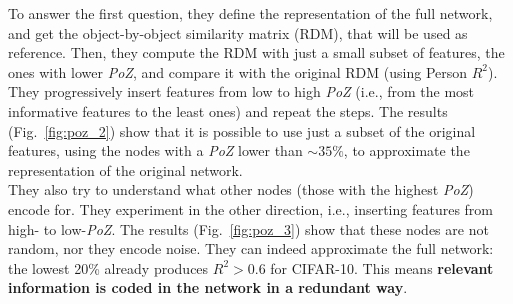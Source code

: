 To answer the first question, they define the representation of the full network, and get the object-by-object similarity matrix (RDM), that will be used as reference. Then, they compute the RDM with just a small subset of features, the ones with lower \textit{PoZ}, and compare it with the original RDM (using Person $R^2$). They progressively insert features from low to high \textit{PoZ} (i.e., from the most informative features to the least ones) and repeat the steps. The results (Fig.~\ref{fig:poz_2}) show that it is possible to use just a subset of the original features, using the nodes with a \textit{PoZ} lower than $\sim35\%$, to approximate the representation of the original network.\\

They also try to understand what other nodes (those with the highest \textit{PoZ}) encode for. They experiment in the other direction, i.e., inserting features from high- to low-\textit{PoZ}. The results (Fig.~\ref{fig:poz_3}) show that these nodes are not random, nor they encode noise. They can indeed approximate the full network: the lowest 20\% already produces $R^2>0.6$ for CIFAR-10. This means \textbf{relevant information is coded in the network in a redundant way}.


